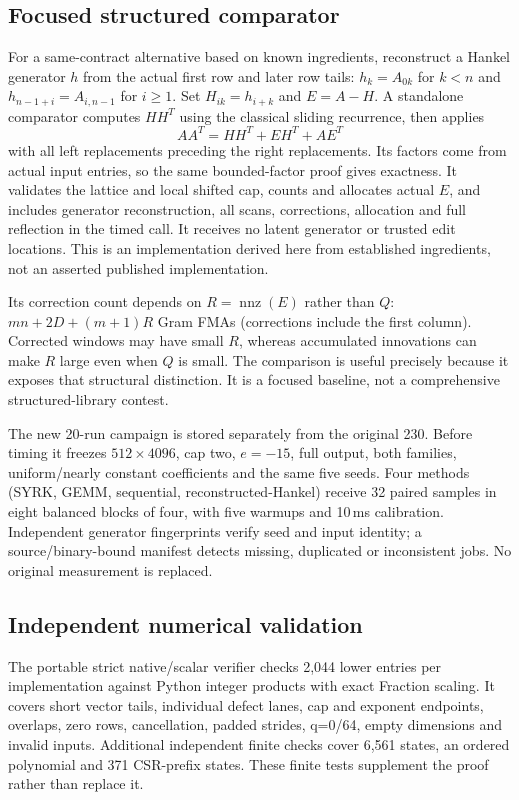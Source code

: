 \documentclass[10pt,a4paper]{article}
\begin{document}
\subsection{Focused structured comparator}\label{sec:special}
For a same-contract alternative based on known ingredients, reconstruct a
Hankel generator $h$ from the actual first row and later row tails:
$h_k=A_{0k}$ for $k<n$ and $h_{n-1+i}=A_{i,n-1}$ for $i\ge1$. Set
$H_{ik}=h_{i+k}$ and $E=A-H$. A standalone comparator computes $HH^T$
using the classical sliding recurrence, then applies
\[
 AA^T=HH^T+EH^T+AE^T
\]
with all left replacements preceding the right replacements. Its factors
come from actual input entries, so the same bounded-factor proof gives
exactness. It validates the lattice and local shifted cap, counts and allocates
actual $E$, and includes generator reconstruction, all scans, corrections,
allocation and full reflection in the timed call. It receives no latent
generator or trusted edit locations. This is an implementation derived here
from established ingredients, not an asserted published implementation.

Its correction count depends on $R=\operatorname{nnz}(E)$ rather than $Q$:
$mn+2D+(m+1)R$ Gram FMAs (corrections include the first column). Corrected windows may have small $R$, whereas accumulated
innovations can make $R$ large even when $Q$ is small. The comparison is useful
precisely because it exposes that structural distinction. It is a focused
baseline, not a comprehensive structured-library contest.

The new 20-run campaign is stored separately from the original 230. Before
timing it freezes $512\times4096$, cap two, $e=-15$, full output, both families,
uniform/nearly constant coefficients and the same five seeds. Four methods
(SYRK, GEMM, sequential, reconstructed-Hankel) receive 32 paired samples in
eight balanced blocks of four, with five warmups and 10\,ms calibration.
Independent generator fingerprints verify seed and input identity; a
source/binary-bound manifest detects missing, duplicated or inconsistent jobs.
No original measurement is replaced.


\subsection{Independent numerical validation}
The portable strict native/scalar verifier checks 2,044 lower entries per
implementation against Python integer products with exact Fraction scaling.
It covers short vector tails, individual defect lanes, cap and exponent
endpoints, overlaps, zero rows, cancellation, padded strides, q=0/64, empty
dimensions and invalid inputs. Additional independent finite checks cover
6,561 states, an ordered polynomial and 371 CSR-prefix states. These finite
tests supplement the proof rather than replace it.
\end{document}
